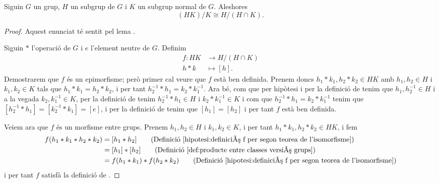 \documentclass[../Apunts.tex]{subfiles}
\begin{document}
	\begin{theorem}
		\label{thm:Segon Teorema de l'isomorfisme entre grups}
		Siguin \(G\) un grup, \(H\) un subgrup de \(G\) i \(K\) un subgrup normal de \(G\). Aleshores
		\[(HK)/K\cong H/(H\cap K).\]
		\begin{proof}
			Aquest enunciat té sentit pel lema .
			
			Siguin \(\ast\) l'operació de \(G\) i \(e\) l'element neutre de \(G\). Definim
			\begin{align}\label{hipotesi:definició f per segon teorea de l'isomorfisme}
			f\colon HK&\longrightarrow H/(H\cap K)\\
			h\ast k&\longmapsto [h].\nonumber
			\end{align}
			Demostrarem que \(f\) és un epimorfisme; però primer cal veure que \(f\) està ben definida. Prenem doncs \(h_{1}\ast k_{1},h_{2}\ast k_{2}\in HK\) amb \(h_{1},h_{2}\in H\) i \(k_{1},k_{2}\in K\) tals que \(h_{1}\ast k_{1}=h_{2}\ast k_{2}\), i per tant \(h_{2}^{-1}\ast h_{1}=k_{2}\ast k_{1}^{-1}\). Ara bé, com que per hipòtesi i per la definició de  tenim que \(h_{1},h_{2}^{-1}\in H\) i a la vegada \(k_{2},k_{1}^{-1}\in K\), per la definició de  tenim \(h_{2}^{-1}\ast h_{1}\in H\) i \(k_{2}\ast k_{1}^{-1}\in K\) i com que \(h_{2}^{-1}\ast h_{1}=k_{2}\ast k_{1}^{-1}\) tenim que \([h_{2}^{-1}\ast h_{1}]=[k_{2}^{-1}\ast k_{1}]=[e]\), i per la definició de  %
			tenim que \([h_{1}]=[h_{2}]\) i per tant \(f\) està ben definida.
			
			Veiem ara que \(f\) és un morfisme entre grups. Prenem \(h_{1},h_{2}\in H\) i \(k_{1},k_{2}\in K\), i per tant \(h_{1}\ast k_{1},h_{2}\ast k_{2}\in HK\), i fem
			\begin{align*}
			f(h_{1}\ast k_{1}\ast h_{2}\ast k_{2})&=[h_{1}\ast h_{2}]\tag{Definició \eqref{hipotesi:definició f per segon teorea de l'isomorfisme}}\\
			&=[h_{1}]\ast[h_{2}]\tag{Definició \eqref{def:producte entre classes versió grups}}\\
			&=f(h_{1}\ast k_{1})\ast f(h_{2}\ast k_{2})\tag{Definició \eqref{hipotesi:definició f per segon teorea de l'isomorfisme}}
			\end{align*}
			i per tant \(f\) satisfà la definició de .
			

\end{proof}
\end{theorem}
\end{document}
